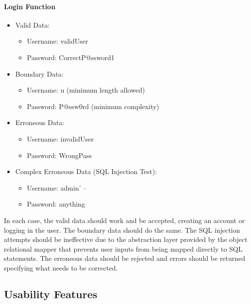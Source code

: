 \documentclass{article}
\begin{document}
\paragraph{Login Function}

\begin{itemize}
  \item Valid Data:
  \begin{itemize}
    \item Username: validUser
    \item Password: CorrectP@ssword1
  \end{itemize}
  \item Boundary Data:
  \begin{itemize}
    \item Username: u (minimum length allowed)
    \item Password: P@ssw0rd (minimum complexity)
  \end{itemize}
  \item Erroneous Data:
  \begin{itemize}
    \item Username: invalidUser
    \item Password: WrongPass
  \end{itemize}
  \item Complex Erroneous Data (SQL Injection Test):
  \begin{itemize}
    \item Username: admin' --
    \item Password: anything
  \end{itemize}
\end{itemize}

In each case, the valid data should work and be accepted, creating an account or logging in the user. The boundary data should do the same. The SQL injection attempts should be ineffective due to the abstraction layer provided by the object relational mapper that prevents user inputs from being mapped directly to SQL statements. The erroneous data should be rejected and errors should be returned specifying what needs to be corrected.

\subsection{Usability Features}
\end{document}
